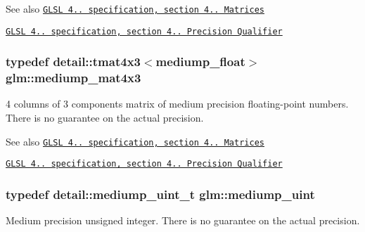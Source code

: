 \begin{DoxySeeAlso}{\-See also}
\href{http://www.opengl.org/registry/doc/GLSLangSpec.4.20.8.pdf}{\tt \-G\-L\-S\-L 4.. specification, section 4.. \-Matrices} 

\href{http://www.opengl.org/registry/doc/GLSLangSpec.4.20.8.pdf}{\tt \-G\-L\-S\-L 4.. specification, section 4.. \-Precision \-Qualifier} 
\end{DoxySeeAlso}
\hypertarget{group__core__precision_ga2c1b39d629d83063a0d59cf14b4f52a3}{
\subsubsection[{mediump\-\_\-mat4x3}]{\setlength{\rightskip}{0pt plus 5cm}typedef detail\-::tmat4x3$<$mediump\-\_\-float$>$ {\bf glm\-::mediump\-\_\-mat4x3}}}\label{group__core__precision_ga2c1b39d629d83063a0d59cf14b4f52a3}
4 columns of 3 components matrix of medium precision floating-\/point numbers. \-There is no guarantee on the actual precision.

\begin{DoxySeeAlso}{\-See also}
\href{http://www.opengl.org/registry/doc/GLSLangSpec.4.20.8.pdf}{\tt \-G\-L\-S\-L 4.. specification, section 4.. \-Matrices} 

\href{http://www.opengl.org/registry/doc/GLSLangSpec.4.20.8.pdf}{\tt \-G\-L\-S\-L 4.. specification, section 4.. \-Precision \-Qualifier} 
\end{DoxySeeAlso}
\hypertarget{group__core__precision_ga08ae38ad78ade3539fdd1d25052b8c51}{
\subsubsection[{mediump\-\_\-uint}]{\setlength{\rightskip}{0pt plus 5cm}typedef detail\-::mediump\-\_\-uint\-\_\-t {\bf glm\-::mediump\-\_\-uint}}}\label{group__core__precision_ga08ae38ad78ade3539fdd1d25052b8c51}
\-Medium precision unsigned integer. \-There is no guarantee on the actual precision.


